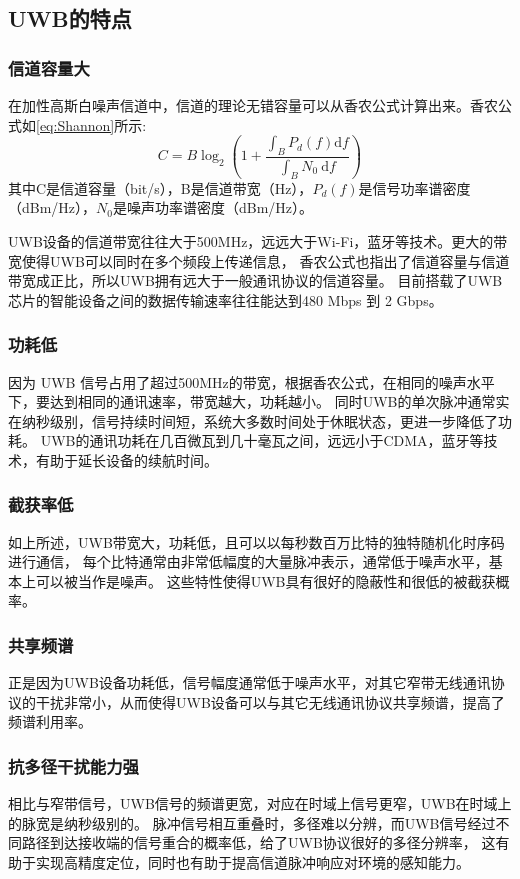 \subsection{UWB的特点}

\subsubsection{信道容量大}
在加性高斯白噪声信道中，信道的理论无错容量可以从香农公式\cite{Shannon}计算出来。香农公式如\ref{eq:Shannon}所示:
\begin{equation}\label{eq:Shannon}
C=B \log _2\left(1+\frac{\int_B P_d(f) \mathrm{d} f}{\int_B N_0 \mathrm{~d} f}\right)
\end{equation}
其中C是信道容量（bit/s），B是信道带宽（Hz），\(P_d(f)\)是信号功率谱密度（dBm/Hz），\(N_0\)是噪声功率谱密度（dBm/Hz）。

UWB设备的信道带宽往往大于500MHz，远远大于Wi-Fi，蓝牙等技术。更大的带宽使得UWB可以同时在多个频段上传递信息，
香农公式也指出了信道容量与信道带宽成正比，所以UWB拥有远大于一般通讯协议的信道容量。
目前搭载了UWB芯片的智能设备之间的数据传输速率往往能达到480 Mbps 到 2 Gbps。

\subsubsection{功耗低}
因为 UWB 信号占用了超过500MHz的带宽，根据香农公式，在相同的噪声水平下，要达到相同的通讯速率，带宽越大，功耗越小。
同时UWB的单次脉冲通常实在纳秒级别，信号持续时间短，系统大多数时间处于休眠状态，更进一步降低了功耗。
UWB的通讯功耗在几百微瓦到几十毫瓦之间，远远小于CDMA，蓝牙等技术，有助于延长设备的续航时间\cite{CDMA}。

\subsubsection{截获率低}
如上所述，UWB带宽大，功耗低，且可以以每秒数百万比特的独特随机化时序码进行通信，
每个比特通常由非常低幅度的大量脉冲表示，通常低于噪声水平，基本上可以被当作是噪声。
这些特性使得UWB具有很好的隐蔽性和很低的被截获概率。

\subsubsection{共享频谱}
正是因为UWB设备功耗低，信号幅度通常低于噪声水平，对其它窄带无线通讯协议的干扰非常小，从而使得UWB设备可以与其它无线通讯协议共享频谱，提高了频谱利用率。

\subsubsection{抗多径干扰能力强}
相比与窄带信号，UWB信号的频谱更宽，对应在时域上信号更窄，UWB在时域上的脉宽是纳秒级别的。
脉冲信号相互重叠时，多径难以分辨，而UWB信号经过不同路径到达接收端的信号重合的概率低，给了UWB协议很好的多径分辨率，
这有助于实现高精度定位，同时也有助于提高信道脉冲响应对环境的感知能力\cite{xhl_thesis}。

